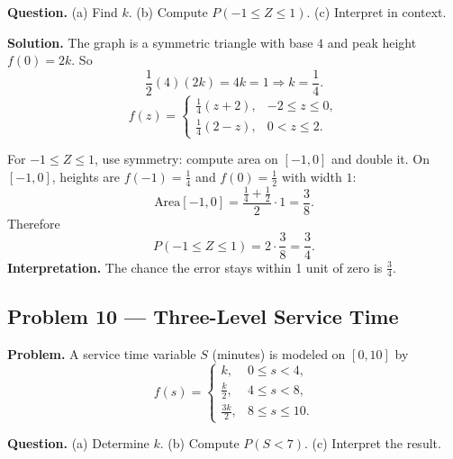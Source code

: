 \begin{ExamProblems}
		\textbf{Question.}
		(a) Find $k$.
		(b) Compute $P(-1\le Z\le 1)$.
		(c) Interpret in context.
		
		\textbf{Solution.}
		The graph is a symmetric triangle with base $4$ and peak height $f(0)=2k$.
		So
		\[
		\frac{1}{2}(4)(2k)=4k=1\Rightarrow k=\frac{1}{4}.
		\]
		\[
		f(z)=\begin{cases}
		\frac{1}{4}(z+2), & -2\le z\le 0,\\
		\frac{1}{4}(2-z), & 0< z\le 2.
		\end{cases}
		\]
		\begin{center}
		\end{center}
		For $-1\le Z\le 1$, use symmetry:
		compute area on $[-1,0]$ and double it.
		On $[-1,0]$, heights are $f(-1)=\frac{1}{4}$ and $f(0)=\frac{1}{2}$ with width $1$:
		\[
		\text{Area}[-1,0]=\frac{\frac{1}{4}+\frac{1}{2}}{2}\cdot 1=\frac{3}{8}.
		\]
		Therefore
		\[
		P(-1\le Z\le 1)=2\cdot\frac{3}{8}=\frac{3}{4}.
		\]
		\textbf{Interpretation.} The chance the error stays within 1 unit of zero is $\frac{3}{4}$.
		
		
		\item
		\subsection*{Problem 10 — Three-Level Service Time}
		
		\textbf{Problem.}
		A service time variable $S$ (minutes) is modeled on $[0,10]$ by
		\[
		f(s)=\begin{cases}
		k, & 0\le s<4,\\
		\frac{k}{2}, & 4\le s<8,\\
		\frac{3k}{2}, & 8\le s\le 10.
		\end{cases}
		\]
		
		\textbf{Question.}
		(a) Determine $k$.
		(b) Compute $P(S<7)$.
		(c) Interpret the result.
		

\end{ExamProblems}
